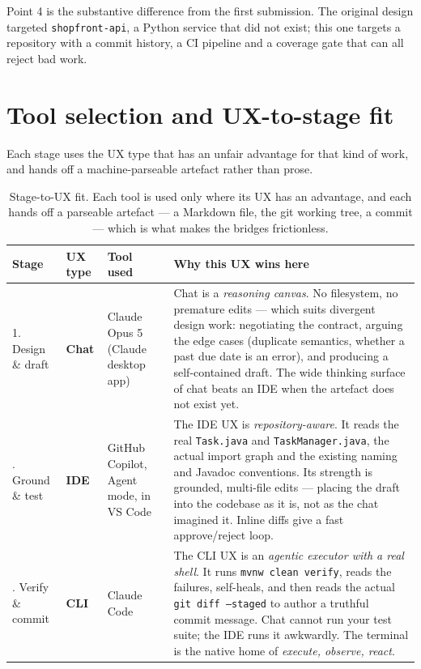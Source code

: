 \documentclass[11pt,a4paper]{article}
\newcommand{\code}[1]{\texttt{\small #1}}
\begin{document}
Point 4 is the substantive difference from the first submission. The original
design targeted \code{shopfront-api}, a Python service that did not exist; this
one targets a repository with a commit history, a CI pipeline and a coverage
gate that can all reject bad work.

\section{Tool selection and UX-to-stage fit}

Each stage uses the UX type that has an unfair advantage for that kind of work,
and hands off a machine-parseable artefact rather than prose.

\begin{table}[h]
\centering
\small
\begin{tabularx}{\textwidth}{@{}p{1.7cm} p{1.3cm} p{2.5cm} X@{}}
\toprule
\textbf{Stage} & \textbf{UX type} & \textbf{Tool used} & \textbf{Why this UX wins here} \\
\midrule
1. Design \& draft
  & \textcolor{chatc}{\textbf{Chat}}
  & Claude Opus 5 (Claude desktop app)
  & Chat is a \emph{reasoning canvas}. No filesystem, no premature edits ---
    which suits divergent design work: negotiating the contract, arguing the
    edge cases (duplicate semantics, whether a past due date is an error), and
    producing a self-contained draft. The wide thinking surface of chat beats
    an IDE when the artefact does not exist yet. \\
\addlinespace
2. Ground \& test
  & \textcolor{idec}{\textbf{IDE}}
  & GitHub Copilot, Agent mode, in VS Code
  & The IDE UX is \emph{repository-aware}. It reads the real
    \code{Task.java} and \code{TaskManager.java}, the actual import graph and
    the existing naming and Javadoc conventions. Its strength is grounded,
    multi-file edits --- placing the draft into the codebase as it is, not as
    the chat imagined it. Inline diffs give a fast approve/reject loop. \\
\addlinespace
3. Verify \& commit
  & \textcolor{clic}{\textbf{CLI}}
  & Claude Code
  & The CLI UX is an \emph{agentic executor with a real shell}. It runs
    \code{mvnw clean verify}, reads the failures, self-heals, and then reads the
    actual \code{git diff --staged} to author a truthful commit message. Chat
    cannot run your test suite; the IDE runs it awkwardly. The terminal is the
    native home of \emph{execute, observe, react}. \\
\bottomrule
\end{tabularx}
\caption{Stage-to-UX fit. Each tool is used only where its UX has an advantage,
and each hands off a parseable artefact --- a Markdown file, the git working
tree, a commit --- which is what makes the bridges frictionless.}
\end{table}
\end{document}
